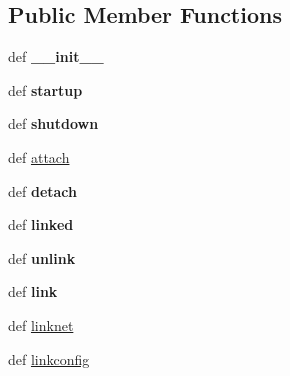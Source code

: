 \subsection*{Public Member Functions}
\begin{DoxyCompactItemize}
\item 
\hypertarget{classcore_1_1bsd_1_1vnet_1_1_netgraph_net_a04b9f288f3e108b8be85b220957b07d3}{def {\bfseries \+\_\+\+\_\+init\+\_\+\+\_\+}}\label{classcore_1_1bsd_1_1vnet_1_1_netgraph_net_a04b9f288f3e108b8be85b220957b07d3}

\item 
\hypertarget{classcore_1_1bsd_1_1vnet_1_1_netgraph_net_a9c00ecf5ce24c7ca4151b3756971c351}{def {\bfseries startup}}\label{classcore_1_1bsd_1_1vnet_1_1_netgraph_net_a9c00ecf5ce24c7ca4151b3756971c351}

\item 
\hypertarget{classcore_1_1bsd_1_1vnet_1_1_netgraph_net_a04499f1ac17c114c8148709fc0e28f6b}{def {\bfseries shutdown}}\label{classcore_1_1bsd_1_1vnet_1_1_netgraph_net_a04499f1ac17c114c8148709fc0e28f6b}

\item 
def \hyperlink{classcore_1_1bsd_1_1vnet_1_1_netgraph_net_a6a7955ff35fb83eebabb6a329bdea9f6}{attach}
\item 
\hypertarget{classcore_1_1bsd_1_1vnet_1_1_netgraph_net_a9630aa67d1e3dd7df4e93c11964e36e3}{def {\bfseries detach}}\label{classcore_1_1bsd_1_1vnet_1_1_netgraph_net_a9630aa67d1e3dd7df4e93c11964e36e3}

\item 
\hypertarget{classcore_1_1bsd_1_1vnet_1_1_netgraph_net_a026825efedb1136249e46adefa38a061}{def {\bfseries linked}}\label{classcore_1_1bsd_1_1vnet_1_1_netgraph_net_a026825efedb1136249e46adefa38a061}

\item 
\hypertarget{classcore_1_1bsd_1_1vnet_1_1_netgraph_net_a79486b945c0aca99f0e49c0e2d184eca}{def {\bfseries unlink}}\label{classcore_1_1bsd_1_1vnet_1_1_netgraph_net_a79486b945c0aca99f0e49c0e2d184eca}

\item 
\hypertarget{classcore_1_1bsd_1_1vnet_1_1_netgraph_net_aa4cc0d5e1eba7969f76a4acdf4f8f8ec}{def {\bfseries link}}\label{classcore_1_1bsd_1_1vnet_1_1_netgraph_net_aa4cc0d5e1eba7969f76a4acdf4f8f8ec}

\item 
def \hyperlink{classcore_1_1bsd_1_1vnet_1_1_netgraph_net_ade62829bc622dd3d8a56e4afebfca9b0}{linknet}
\item 
def \hyperlink{classcore_1_1bsd_1_1vnet_1_1_netgraph_net_a3cddab769084a7094fa9c4521e6a645d}{linkconfig}
\end{DoxyCompactItemize}
